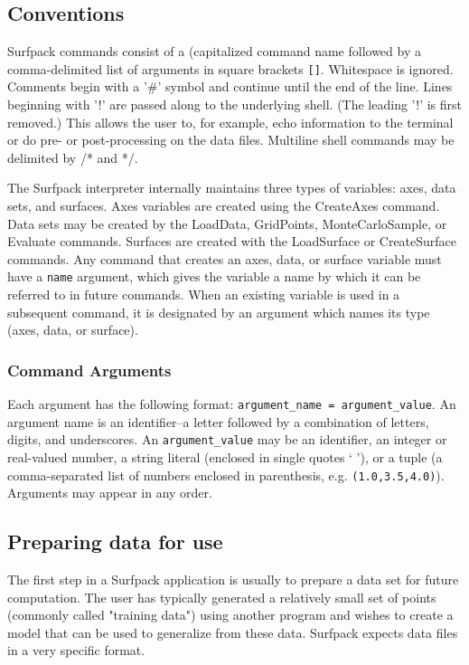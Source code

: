 \documentclass{article}
\begin{document}
\subsection{Conventions}
Surfpack commands consist of a (capitalized command name followed by a
comma-delimited list of arguments in square brackets \texttt{[]}.
Whitespace is ignored.  Comments begin with a '\#' symbol and continue until the end of the line.  Lines beginning with '!' are passed along to the underlying shell.  (The leading '!' is first removed.)  This allows the user to, for example, echo information to the terminal or do pre- or post-processing on the data files.  Multiline shell commands may be delimited by /* and */.

The Surfpack interpreter internally maintains three types of variables: axes, data sets, and surfaces.  Axes variables are created using the CreateAxes command.  Data sets may be created by the LoadData, GridPoints, MonteCarloSample, or Evaluate commands.  Surfaces are created with the LoadSurface or CreateSurface commands.  Any command that creates an axes, data, or surface variable must have a \texttt{name} argument, which gives the variable a name by which it can be referred to in future commands.  When an existing variable is used in a subsequent command, it is designated by an argument which names its type (axes, data, or surface).  



\subsubsection{Command Arguments}\label{sec:arguments}

Each argument has the following format: \texttt{argument\_name =
  argument\_value}.  An argument name is an identifier--a letter
followed by a combination of letters, digits, and underscores.  An
\texttt{argument\_value} may be an identifier, an integer or
real-valued number, a string literal (enclosed in single quotes ` '),
or a tuple (a comma-separated list of numbers enclosed in parenthesis,
e.g. \texttt{(1.0,3.5,4.0)}).  Arguments may appear in any order.

\subsection{Preparing data for use}\label{sec:format}
The first step in a Surfpack application is usually to prepare a data set for future computation.  The user has typically generated a relatively small set of points (commonly called "training data") using another program and wishes to create a model that can be used to generalize from these data.  Surfpack expects data files in a very specific format.
\end{document}
